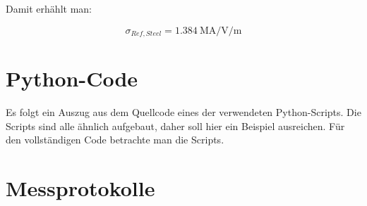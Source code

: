 Damit erh\"ahlt man:

\begin{equation*}
    \sigma_{Ref,Steel} = \SI{1.384}{\mega\ampere\per\volt\per\meter}
\end{equation*}


\clearpage
\section{Python-Code}
\label{app:python}

Es   folgt   ein   Auszug   aus    dem   Quellcode   eines   der   verwendeten
Python-Scripts. Die Scripts  sind alle  \"ahnlich  aufgebaut, daher  soll hier
ein  Beispiel ausreichen. F\"ur  den  vollst\"andigen Code  betrachte man  die
Scripts.


\clearpage
\section{Messprotokolle}
\label{app:protocols}
%
